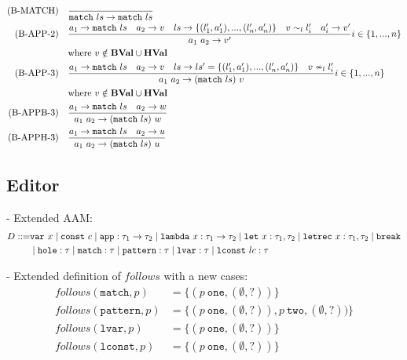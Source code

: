 \documentclass[10pt,a4paper,english]{article}
\newcommand\match[1]{\texttt{match}~#1}
\begin{document}
\begin{align}
  (\text{B-MATCH})\quad& \frac{}{\match{ls}\to\match{ls}}\\
  (\text{B-APP-2})\quad& \frac{a_1\to\match{ls}\quad a_2\to v\quad ls\to \{(l'_1,a'_1),...,(l'_n,a'_n)\}\quad v\sim_l l'_i\quad a_i'\to v'}{\app{a_1}{a_2}\to v'}i\in\{1,...,n\}\\
                       &\text{where}~v \notin \textbf{BVal} \cup \textbf{HVal}\\
  (\text{B-APP-3})\quad& \frac{a_1\to\match{ls}\quad a_2\to v\quad ls\to ls'=\{(l'_1,a'_1),...,(l'_n,a'_n)\}\quad v\nsim_l l'_i}{\app{a_1}{a_2}\to \app{(\texttt{match}~ls)}{v}} i\in\{1,...,n\}\\
                       &\text{where}~v \notin \textbf{BVal} \cup \textbf{HVal}\\
  (\text{B-APPB-3})\quad& \frac{a_1\to\match{ls}\quad a_2\to w}{\app{a_1}{a_2}\to \app{(\texttt{match}~ls)}{w}}\\
  (\text{B-APPH-3})\quad& \frac{a_1\to\match{ls}\quad a_2\to u}{\app{a_1}{a_2}\to \app{(\texttt{match}~ls)}{u}}
\end{align}

\subsection{Editor}
- Extended AAM:
\begin{align}
  D ::= &\texttt{var}~x
  \mid \texttt{const}~c
  \mid \texttt{app} : \tau_1\to\tau_2
  \mid \texttt{lambda}~x : \tau_1\to\tau_2
  \mid \texttt{let}~x : \tau_1,\tau_2
  \mid \texttt{letrec}~x : \tau_1,\tau_2
  \mid \texttt{break}\\
  &\mid \texttt{hole} : \tau
  \mid \texttt{match} : \tau
  \mid\texttt{pattern} : \tau
  \mid \texttt{lvar} : \tau
  \mid \texttt{lconst}~lc : \tau
\end{align}

- Extended definition of $follows$ with a new cases:
\begin{align}
  follows(\texttt{match}, p) &= \{ (p~\texttt{one}, (\emptyset, ?))\}\\
  follows(\texttt{pattern}, p) &= \{ (p~\texttt{one}, (\emptyset, ?)), p~\texttt{two}, (\emptyset, ?))\}\\
  follows(\texttt{lvar}, p) &= \{ (p~\texttt{one}, (\emptyset, ?))\}\\
  follows(\texttt{lconst}, p) &= \{ (p~\texttt{one}, (\emptyset, ?))\}
\end{align}
\end{document}
